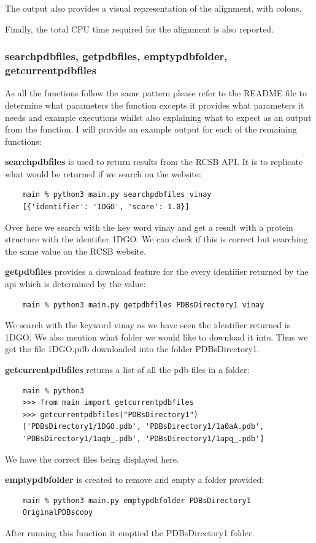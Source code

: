 \documentclass[]{final_report}
\begin{document}
The output also provides a visual representation of the alignment, with colons.

Finally, the total CPU time required for the alignment is also reported.

\clearpage

\subsubsection{searchpdbfiles, getpdbfiles, emptypdbfolder, getcurrentpdbfiles}

As all the functions follow the same pattern please refer to the README file to determine what parameters the function excepts it provides what parameters it needs and example executions whilst also explaining what to expect as an output from the function. I will provide an example output for each of the remaining functions:

\textbf{searchpdbfiles} is used to return results from the RCSB API. It is to replicate what would be returned if we search on the website:
\begin{lstlisting}
    main % python3 main.py searchpdbfiles vinay
    [{'identifier': '1DGO', 'score': 1.0}]
\end{lstlisting}
Over here we search with the key word vinay and get a result with a protein structure with the identifier 1DGO. We can check if this is correct but searching the same value on the RCSB website.

\textbf{getpdbfiles} provides a download feature for the every identifier returned by the api which is determined by the value:
\begin{lstlisting}
    main % python3 main.py getpdbfiles PDBsDirectory1 vinay
\end{lstlisting}
We search with the keyword vinay as we have seen the identifier returned is 1DGO. We also mention what folder we would like to download it into. Thus we get the file 1DGO.pdb downloaded into the folder PDBsDirectory1.

\textbf{getcurrentpdbfiles} returns a list of all the pdb files in a folder:
\begin{lstlisting}
    main % python3
    >>> from main import getcurrentpdbfiles
    >>> getcurrentpdbfiles("PDBsDirectory1")
    ['PDBsDirectory1/1DGO.pdb', 'PDBsDirectory1/1a0aA.pdb',
    'PDBsDirectory1/1aqb_.pdb', 'PDBsDirectory1/1apq_.pdb']
\end{lstlisting}
We have the correct files being displayed here.

\textbf{emptypdbfolder} is created to remove and empty a folder provided:
\begin{lstlisting}
    main % python3 main.py emptypdbfolder PDBsDirectory1  
    OriginalPDBscopy
\end{lstlisting}
After running this function it emptied the PDBsDirectory1 folder.
\end{document}
